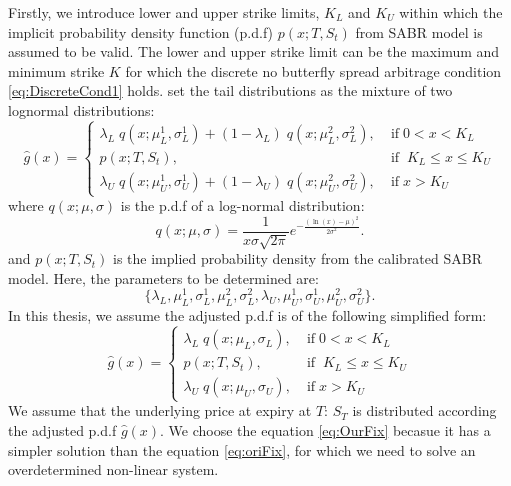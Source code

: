 \documentclass[letterpaper,12pt,titlepage,oneside,final]{book}
\numberwithin{equation}{section}
\theoremstyle{definition}
\begin{document}
Firstly, we introduce lower and upper strike limits, $K_{L}$ and $K_{U}$ within which the implicit probability density function (p.d.f) $p(x;T,S_t)$ from SABR model is assumed to be valid. The lower and upper strike limit can be the maximum and minimum strike $K$ for which the  discrete no butterfly spread arbitrage condition \eqref{eq:DiscreteCond1} holds. \citet{brunner2003arbitrage}  set the tail distributions as the mixture of two lognormal distributions:
\begin{equation}
\hat{g}(x)=\left\{ \begin{array}{ll }
\lambda_{L} \;  q(x;\mu^1_{L},\sigma^1_{L})+(1-\lambda_{L}) \;  q(x;\mu^2_{L},\sigma^2_{L}), \;&  \text{if} \; 0<x< K_{L}\\
p(x;T,S_t) , \;&  \text{if} \; \;  K_{L} \leq x \leq K_{U}\\
\lambda_{U} \;  q(x;\mu^1_{U},\sigma^1_{U})+(1-\lambda_{U}) \;  q(x;\mu^2_{U},\sigma^2_{U}), \;& \text{if} \; x> K_{U}
\end{array} \right.
\label{eq:oriFix}
\end{equation}
where  $q(x;\mu,\sigma)$ is the p.d.f of a  log-normal distribution:
\[
q(x;\mu,\sigma)=\frac{1}{x\sigma \sqrt{2 \pi}}
e^{-\frac{(\ln(x)-\mu)^2}{2 \sigma^2}}.
\]
and $p(x;T,S_t)$ is the implied probability density from the calibrated SABR model.  Here, the parameters to be determined are:\[
\{\lambda_{L}, \mu^1_{L},\sigma^1_{L},\mu^2_{L},\sigma^2_{L},
\lambda_{U}, \mu^1_{U},\sigma^1_{U},\mu^2_{U},\sigma^2_{U}	\}.
\]
In this thesis, we assume the adjusted p.d.f is of the following simplified form:
\begin{equation}
\hat{g}(x)=\left\{ \begin{array}{ll }
\lambda_{L} \;  q(x;\mu_{L},\sigma_{L}), \;&  \text{if} \; 0<x< K_{L}\\
p(x;T,S_t) , \;&  \text{if} \; \;  K_{L} \leq x \leq K_{U}\\
\lambda_{U} \;  q(x;\mu_{U},\sigma_{U}), \;& \text{if} \; x> K_{U}
\end{array} \right.
\label{eq:OurFix}
\end{equation}
We assume that the underlying price at expiry at $T$: $S_T$ is distributed according the adjusted p.d.f $\hat{g}(x)$.
We choose the equation \eqref{eq:OurFix} becasue it has a simpler solution than the equation \eqref{eq:oriFix}, for which we need to solve an overdetermined non-linear system.
\end{document}
